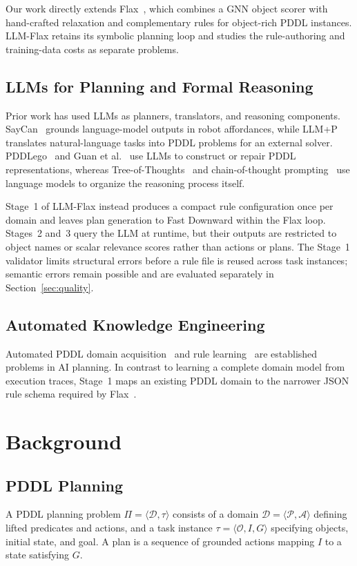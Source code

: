 \documentclass{ieeeaccess}
\newcommand{\sref}[1]{Section~\ref{#1}}
\newcommand{\method}{LLM-Flax\xspace}
\begin{document}
Our work directly extends Flax~\cite{du2026fast}, which combines a GNN object scorer with hand-crafted relaxation and complementary rules for object-rich PDDL instances.
\method retains its symbolic planning loop and studies the rule-authoring and training-data costs as separate problems.

\subsection{LLMs for Planning and Formal Reasoning}
Prior work has used LLMs as planners, translators, and reasoning components.
SayCan~\cite{ahn2022can} grounds language-model outputs in robot affordances, while LLM+P~\cite{liu2023llm+} translates natural-language tasks into PDDL problems for an external solver.
PDDLego~\cite{zhang2023pddl} and Guan et al.~\cite{guan2023leveraging} use LLMs to construct or repair PDDL representations, whereas Tree-of-Thoughts~\cite{yao2023tree} and chain-of-thought prompting~\cite{wei2022chain} use language models to organize the reasoning process itself.

Stage~1 of \method instead produces a compact rule configuration once per domain and leaves plan generation to Fast Downward within the Flax loop.
Stages~2 and~3 query the LLM at runtime, but their outputs are restricted to object names or scalar relevance scores rather than actions or plans.
The Stage~1 validator limits structural errors before a rule file is reused across task instances; semantic errors remain possible and are evaluated separately in \sref{sec:quality}.

\subsection{Automated Knowledge Engineering}
Automated PDDL domain acquisition~\cite{cresswell2013acquiring} and rule learning~\cite{law2019inductive} are established problems in AI planning.
In contrast to learning a complete domain model from execution traces, Stage~1 maps an existing PDDL domain to the narrower JSON rule schema required by Flax~\cite{du2026fast}.


\section{Background}
\label{sec:background}

\subsection{PDDL Planning}
A PDDL planning problem $\Pi = \langle \mathcal{D}, \tau \rangle$ consists of a domain $\mathcal{D} = \langle \mathcal{P}, \mathcal{A} \rangle$ defining lifted predicates and actions, and a task instance $\tau = \langle \mathcal{O}, I, G \rangle$ specifying objects, initial state, and goal.
A plan is a sequence of grounded actions mapping $I$ to a state satisfying $G$.
\end{document}
